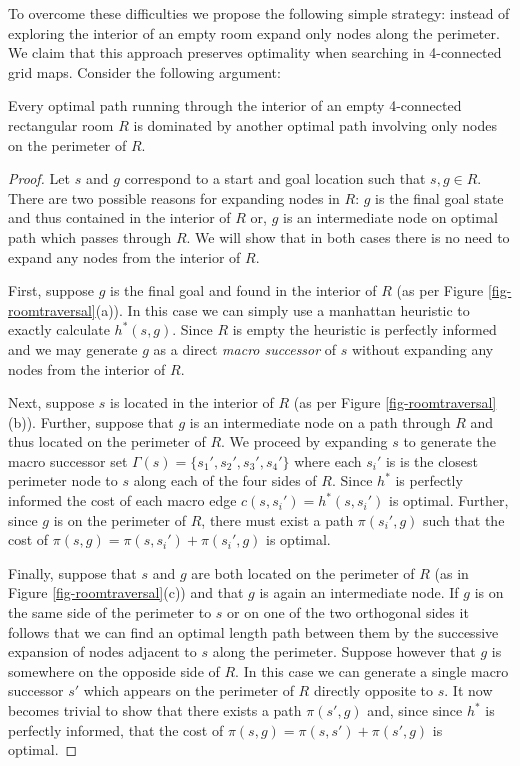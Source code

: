 \par
To overcome these difficulties we propose the following simple strategy:
instead of exploring the interior of an empty room expand only nodes along the
perimeter. We claim that this approach preserves optimality when searching in 
4-connected grid maps. 
Consider the following argument:

\begin{mylemma}
\label{thm-roomtraversal}
Every optimal path running through the interior of an empty 4-connected rectangular 
room $R$ is dominated by another 
optimal path involving only nodes on the perimeter of $R$.
\end{mylemma}
\begin{proof}
Let $s$ and $g$ correspond to a start and goal location such that $s, g \in R$.
There are two possible reasons for expanding nodes in $R$: 
$g$ is the final goal state and thus contained in the interior of $R$ or,
$g$ is an intermediate node on optimal path which passes through $R$.
We will show that in both cases there is no need to expand any nodes from the interior of $R$.
\par
First, suppose $g$ is the final goal and found in the interior of $R$ 
(as per Figure \ref{fig-roomtraversal}(a)).
In this case we can simply use a manhattan heuristic to exactly calculate $h^*(s, g)$.
Since $R$ is empty the heuristic is perfectly informed and we may generate $g$
as a direct \emph{macro successor} of $s$ without expanding any nodes from the interior of $R$.
\par
Next, suppose $s$ is located in the interior of $R$ (as per Figure \ref{fig-roomtraversal}(b)).
Further, suppose that $g$ is an intermediate node on a path through $R$ and thus
located on the perimeter of $R$.
We proceed by expanding $s$ to generate the macro successor set 
$\Gamma(s) = \lbrace s_{1}', s_{2}', s_{3}', s_{4}'\rbrace$ where each $s_{i}'$ is 
is the closest perimeter node to $s$ along each of the four sides of $R$.
Since $h^*$ is perfectly informed the cost of each macro edge 
$c(s, s_{i}') = h^*(s, s_{i}')$ is optimal.
Further, since $g$ is on the perimeter of $R$, there must exist a path $\pi(s_{i}', g)$ 
such that the cost of $\pi(s, g) = \pi(s, s_{i}') + \pi(s_{i}', g)$ is optimal.
\par
Finally, suppose that $s$ and $g$ are both located on the perimeter of $R$ 
(as in Figure \ref{fig-roomtraversal}(c)) and that $g$ is again an intermediate node.
If $g$ is on the same side of the perimeter to $s$ or on one of the two orthogonal sides 
it follows that we can find an optimal length path between them by the successive expansion of 
nodes adjacent to $s$ along the perimeter.
Suppose however that $g$ is somewhere on the opposide side of $R$.
In this case we can generate a single macro successor $s'$ which appears on the 
perimeter of $R$ directly opposite to $s$.
It now becomes trivial to show that there exists a path $\pi(s',g)$ and, 
since since $h^*$ is perfectly informed, that the cost of  
$\pi(s, g) = \pi(s, s') + \pi(s', g)$ is optimal.
\end{proof}

